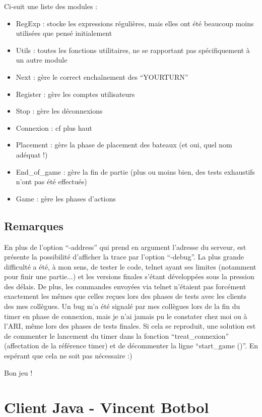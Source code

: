 \documentclass[a4paper, 11pt]{report}
\begin{document}
Ci-suit une liste des modules :
\begin{itemize}
\item RegExp : stocke les expressions régulières, mais elles ont été beaucoup moins utilisées que pensé initialement
\item Utils : toutes les fonctions utilitaires, ne se rapportant pas spécifiquement à un autre module
\item Next : gère le correct enchaînement des ``YOURTURN''
\item Register : gère les comptes utilisateurs
\item Stop : gère les déconnexions
\item Connexion : cf plus haut
\item Placement : gère la phase de placement des bateaux (et oui, quel nom adéquat !)
\item End\_of\_game : gère la fin de partie (plus ou moins bien, des tests exhaustifs n'ont pas été effectués)
\item Game : gère les phases d'actions
\end{itemize}

\section{Remarques}

En plus de l'option ``-address'' qui prend en argument l'adresse du serveur, est présente la possibilité d'afficher la trace par l'option ``-debug''.
\medskip
La plus grande difficulté a été, à mon sens, de tester le code, telnet ayant ses limites (notamment pour finir une partie...) et les versions finales s'étant développées sous la pression des délais. De plus, les commandes envoyées via telnet n'étaient pas forcément exactement les mêmes que celles reçues lors des phases de tests avec les clients des mes collègues.
\medskip
Un bug m'a été signalé par mes collègues lors de la fin du timer en phase de connexion, mais je n'ai jamais pu le constater chez moi ou à l'ARI, même lors des phases de tests finales. Si cela se reproduit, une solution est de commenter le lancement du timer dans la fonction ``treat\_connexion'' (affectation de la référence timer) et de décommenter la ligne ``start\_game ()''. En espérant que cela ne soit pas nécessaire :)
\bigskip

Bon jeu !

\chapter{Client Java - Vincent Botbol}
\end{document}
